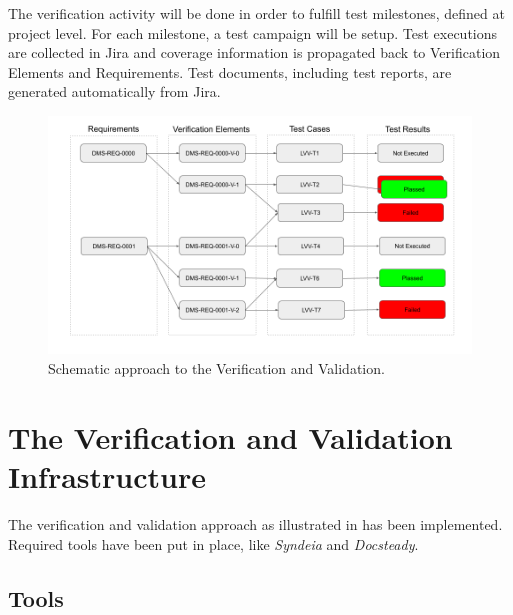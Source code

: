 The verification activity will be done in order to fulfill test milestones, defined at project level.
For each milestone, a test campaign will be setup. 
Test executions are collected in Jira and coverage information is propagated back to Verification Elements and Requirements.
Test documents, including test reports, are generated automatically from Jira.

\begin{figure}
\begin{center}
\includegraphics[width=\textwidth]{imgs/VandVSchema.png}
 \caption{Schematic approach to the Verification and Validation.}
 \label{fig:vandvschema}
\end{center}
\end{figure}


\section{The Verification and Validation Infrastructure}

The verification and validation approach as illustrated in \cite{10.1117/12.2310125}  has been implemented.
Required tools have been put in place, like \textit{Syndeia} and \textit{Docsteady}.


\subsection{Tools}

